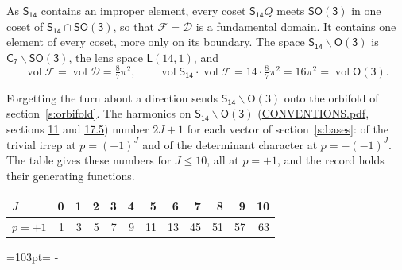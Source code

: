 \documentclass[10pt,a4paper]{article}
\newcommand{\needspace}[1]{\par\penalty-100\begingroup\dimen0=#1\relax\dimen2=\pagegoal
  \advance\dimen2-\pagetotal\ifdim\dimen0>\dimen2\relax\ifdim\dimen2>0pt\vfil\break\fi\fi
  \endgroup}
\numberwithin{equation}{section}
\newcommand{\grp}[1]{\mathsf{#1}}
\newcommand{\vol}{\operatorname{vol}}
\newcommand{\fcell}{\mathcal{D}}
\newcommand{\fdomain}{\mathcal{F}}
\newcommand{\lensspace}[2]{\mathsf{L}(#1, #2)}
\begin{document}
\leavevmode\label{n:set.fundamental}As $\grp{S_{14}}$ contains an improper element, every coset $\grp{S_{14}}Q$ meets \href{SO3.pdf}{$\grp{SO(3)}$} in one coset of $\grp{S_{14}} \cap \grp{SO(3)}$, so that $\fdomain = \fcell$ is a fundamental domain. It contains one element of every coset, more only on its boundary.
\leavevmode\label{n:set.lens}The space $\grp{S_{14}}\backslash\grp{O(3)}$ is $\grp{C_{7}}\backslash\grp{SO(3)}$, the lens space $\lensspace{14}{1}$, and
\begin{equation}\label{e:volume}\vol\fdomain = \vol\fcell = \tfrac{8}{7}\pi^2,\qquad \vol\grp{S_{14}}\cdot\vol\fdomain = 14\cdot \tfrac{8}{7}\pi^2 = 16\pi^2 = \vol\grp{O(3)}.\end{equation}

Forgetting the turn about a direction sends $\grp{S_{14}}\backslash\grp{O(3)}$ onto the orbifold of section~\ref{s:orbifold}.
The harmonics on $\grp{S_{14}}\backslash\grp{O(3)}$ (\href{../../CONVENTIONS.pdf}{CONVENTIONS.pdf}, sections \href{../../CONVENTIONS.pdf\#conv.11}{11} and \href{../../CONVENTIONS.pdf\#conv.17.5}{17.5}) number $2J + 1$ for each vector of section~\ref{s:bases}: of the trivial irrep at $p = (-1)^J$ and of the determinant character at $p = -(-1)^J$. The table gives these numbers for $J \le 10$, all at $p = +1$, and the record holds their generating functions.
{\small\setlength{\tabcolsep}{4pt}\begin{longtable}{@{}lrrrrrrrrrrr@{}}\toprule
$J$ & 0 & 1 & 2 & 3 & 4 & 5 & 6 & 7 & 8 & 9 & 10\\\midrule\endhead
\bottomrule\endfoot\endlastfoot
$p = +1$ & 1 & 3 & 5 & 7 & 9 & 11 & 13 & 45 & 51 & 57 & 63\\
\bottomrule\end{longtable}}
\needspace{103pt}
\end{document}
